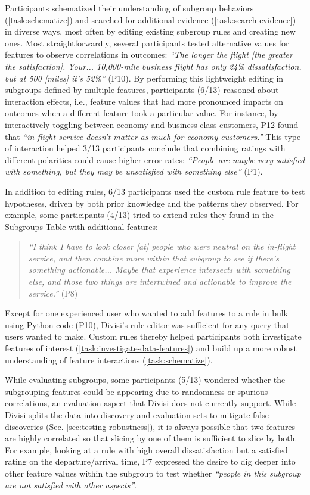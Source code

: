 Participants schematized their understanding of subgroup behaviors (\ref{task:schematize}) and searched for additional evidence (\ref{task:search-evidence}) in diverse ways, most often by editing existing subgroup rules and creating new ones.
Most straightforwardly, several participants tested alternative values for features to observe correlations in outcomes: \textit{``The longer the flight [the greater the satisfaction]. Your... 10,000-mile business flight has only 24\% dissatisfaction, but at 500 [miles] it's 52\%''} (P10).
By performing this lightweight editing in subgroups defined by multiple features, participants (6/13) reasoned about interaction effects, i.e., feature values that had more pronounced impacts on outcomes when a different feature took a particular value.
For instance, by interactively toggling between economy and business class customers, P12 found that \textit{``in-flight service doesn't matter as much for economy customers.''}
This type of interaction helped 3/13 participants conclude that combining ratings with different polarities could cause higher error rates: \textit{``People are maybe very satisfied with something, but they may be unsatisfied with something else''} (P1).

In addition to editing rules, 6/13 participants used the custom rule feature to test hypotheses, driven by both prior knowledge and the patterns they observed.
For example, some participants (4/13) tried to extend rules they found in the Subgroups Table with additional features:
\begin{quote}
\textit{``I think I have to look closer [at] people who were neutral on the in-flight service, and then combine more within that subgroup to see if there's something actionable... Maybe that experience intersects with something else, and those two things are intertwined and actionable to improve the service.''} (P8)
\end{quote}
Except for one experienced user who wanted to add features to a rule in bulk using Python code (P10), Divisi's rule editor was sufficient for any query that users wanted to make.
Custom rules thereby helped participants both investigate features of interest (\ref{task:investigate-data-features}) and build up a more robust understanding of feature interactions (\ref{task:schematize}).

While evaluating subgroups, some participants (5/13) wondered whether the subgrouping features could be appearing due to randomness or spurious correlations, an evaluation aspect that Divisi does not currently support.
While Divisi splits the data into discovery and evaluation sets to mitigate false discoveries (Sec. \ref{sec:testing-robustness}), it is always possible that two features are highly correlated so that slicing by one of them is sufficient to slice by both.
For example, looking at a rule with high overall dissatisfaction but a satisfied rating on the departure/arrival time, P7 expressed the desire to dig deeper into other feature values within the subgroup to test whether \textit{``people in this subgroup are not satisfied with other aspects''}.


